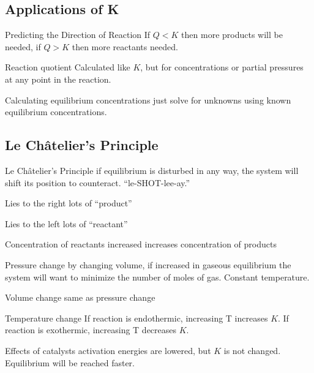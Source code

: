 \begin{mdframed}
\begin{multicols}{2}
\subsection{Applications of K}
\begin{compactdesc}
    \item[Predicting the Direction of Reaction] If $Q < K$ then more products
        will be needed, if $Q > K$ then more reactants needed.
    \item[Reaction quotient] Calculated like $K$, but for concentrations or
        partial pressures at any point in the reaction.
    \item[Calculating equilibrium concentrations] just solve for unknowns using
        known equilibrium concentrations.
\end{compactdesc}
\end{multicols}
\end{mdframed}


\begin{mdframed}
\subsection{Le Ch\^{a}telier's Principle}
\begin{multicols}{2}
\begin{compactdesc}
    \item[Le Ch\^{a}telier's Principle] if equilibrium is disturbed in any way,
        the system will shift its position to counteract. ``le-SHOT-lee-ay.''
    \item[Lies to the right] lots of ``product''
    \item[Lies to the left] lots of ``reactant''
    \item[Concentration of reactants increased] increases concentration of products
    \item[Pressure change] by changing volume, if increased in gaseous equilibrium the system
        will want to minimize the number of moles of gas. Constant temperature.
    \item[Volume change] same as pressure change
    \item[Temperature change] If reaction is endothermic, increasing T
        increases $K$. If reaction is exothermic, increasing T decreases $K$.
    \item[Effects of catalysts] activation energies are lowered,
        but $K$ is not changed. Equilibrium will be reached faster.
\end{compactdesc}
\end{multicols}
\end{mdframed}



